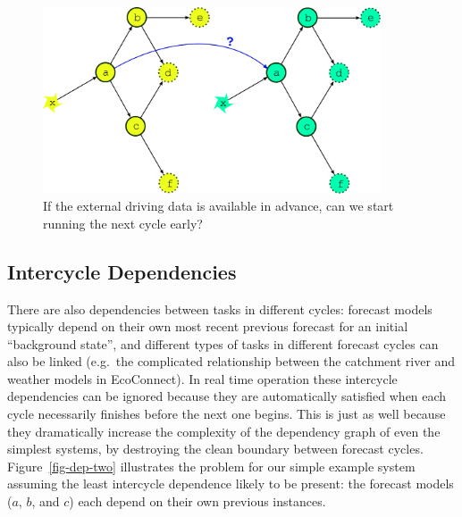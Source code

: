 \documentclass[11pt,a4paper]{article}
\begin{document}
\begin{figure} 
    \begin{center}
        \includegraphics[width=10cm]{inkscape-svg/dep-two-cycles-linked} 
    \end{center}
    \caption{\small If the external driving data is available in
    advance, can we start running the next cycle early?} 
    \label{fig-dep-two-linked}
\end{figure}

\subsection{Intercycle Dependencies}

There are also dependencies between tasks in different cycles: forecast
models typically depend on their own most recent previous forecast for
an initial ``background state'', and different types of tasks in
different forecast cycles can also be linked (e.g.\ the complicated
relationship between the catchment river and weather models in
EcoConnect). In real time operation these intercycle dependencies can be
ignored because they are automatically satisfied when each cycle
necessarily finishes before the next one begins. This is just as well
because they dramatically increase the complexity of the dependency
graph of even the simplest systems, by destroying the clean boundary
between forecast cycles. Figure~\ref{fig-dep-two} illustrates the
problem for our simple example system assuming the least intercycle
dependence likely to be present: the forecast models ($a$, $b$, and $c$)
each depend on their own previous instances.
\end{document}
